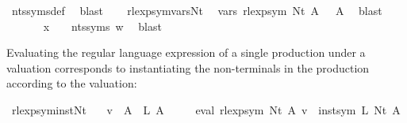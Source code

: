\begin{isabellebody}
\ nts{\isacharunderscore}{\kern0pt}syms{\isacharunderscore}{\kern0pt}def\ \isamarkupfalse%
\ blast\isanewline
\ \ \isamarkupfalse%
\ rlexp{\isacharunderscore}{\kern0pt}sym{\isacharunderscore}{\kern0pt}vars{\isacharunderscore}{\kern0pt}Nt\ \isamarkupfalse%
\ {\isachardoublequoteopen}vars\ {\isacharparenleft}{\kern0pt}rlexp{\isacharunderscore}{\kern0pt}sym\ {\isacharparenleft}{\kern0pt}Nt\ A{\isacharparenright}{\kern0pt}{\isacharparenright}{\kern0pt}\ {\isacharequal}{\kern0pt}\ {\isacharbraceleft}{\kern0pt}{\isasymgamma}{\isacharprime}{\kern0pt}\ A{\isacharbraceright}{\kern0pt}{\isachardoublequoteclose}\ \isamarkupfalse%
\ blast\isanewline
\ \ \isamarkupfalse%
\ {\isacharasterisk}{\kern0pt}\ {\isacharasterisk}{\kern0pt}{\isacharasterisk}{\kern0pt}\ {\isacharasterisk}{\kern0pt}{\isacharasterisk}{\kern0pt}{\isacharasterisk}{\kern0pt}\ {\isacharasterisk}{\kern0pt}{\isacharasterisk}{\kern0pt}{\isacharasterisk}{\kern0pt}{\isacharasterisk}{\kern0pt}\ \isamarkupfalse%
\ {\isachardoublequoteopen}x\ {\isasymin}\ {\isasymgamma}{\isacharprime}{\kern0pt}\ {\isacharbackquote}{\kern0pt}\ nts{\isacharunderscore}{\kern0pt}syms\ w{\isachardoublequoteclose}\ \isamarkupfalse%
\ blast\isanewline
{}\isamarkupfalse%
%
\endisatagproof
{\isafoldproof}%
%
\isadelimproof
%
\endisadelimproof
%
\begin{isamarkuptext}%
Evaluating the regular language expression of a single production under a valuation
corresponds to instantiating the non-terminals in the production according to the valuation:%
\end{isamarkuptext}\isamarkuptrue%
\isamarkupfalse%
\ rlexp{\isacharunderscore}{\kern0pt}sym{\isacharunderscore}{\kern0pt}inst{\isacharunderscore}{\kern0pt}Nt{\isacharcolon}{\kern0pt}\isanewline
\ \ \ {\isachardoublequoteopen}v\ {\isacharparenleft}{\kern0pt}{\isasymgamma}{\isacharprime}{\kern0pt}\ A{\isacharparenright}{\kern0pt}\ {\isacharequal}{\kern0pt}\ L\ A{\isachardoublequoteclose}\isanewline
\ \ \ \ \ {\isachardoublequoteopen}eval\ {\isacharparenleft}{\kern0pt}rlexp{\isacharunderscore}{\kern0pt}sym\ {\isacharparenleft}{\kern0pt}Nt\ A{\isacharparenright}{\kern0pt}{\isacharparenright}{\kern0pt}\ v\ {\isacharequal}{\kern0pt}\ inst{\isacharunderscore}{\kern0pt}sym\ L\ {\isacharparenleft}{\kern0pt}Nt\ A{\isacharparenright}{\kern0pt}{\isachardoublequoteclose}\isanewline
%
\isadelimproof
\ \ %
\endisadelimproof

\end{isabellebody}
